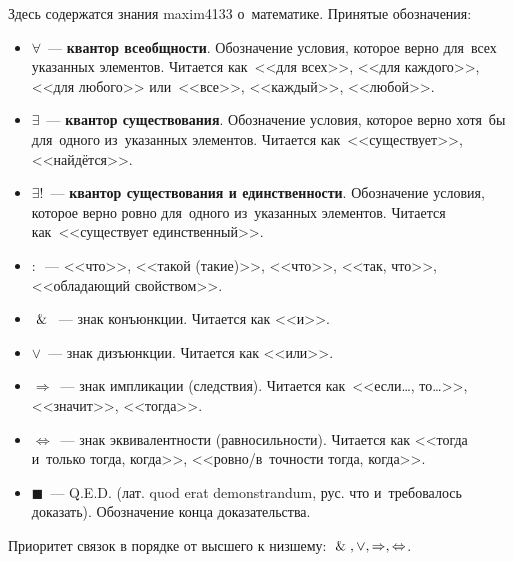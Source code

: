 Здесь содержатся знания maxim4133 о~математике. Принятые обозначения:
\begin{itemize}
	\item $\forall$~--- \textbf{квантор всеобщности}.
	Обозначение условия, которое верно для~всех указанных элементов.
	Читается как~<<для всех>>, <<для каждого>>, <<для любого>> или~<<все>>, <<каждый>>, <<любой>>.
	
	\item $\exists$~--- \textbf{квантор существования}.
	Обозначение условия, которое верно хотя~бы для~одного из~указанных элементов.
	Читается как~<<существует>>, <<найдётся>>.
	
	\item $\exists!$~--- \textbf{квантор существования и единственности}.
	Обозначение условия, которое верно ровно для~одного из~указанных элементов.
	Читается как~<<существует единственный>>.
	
	\item $\colon$~--- <<что>>, <<такой (такие)>>, <<что>>, <<так, что>>, <<обладающий свойством>>.
	
	\item $\And$~--- знак конъюнкции. Читается как <<и>>.
	
	\item $\lor$~--- знак дизъюнкции. Читается как <<или>>.
	
	\item $\Rightarrow$~--- знак импликации (следствия).
	Читается как~<<если\dots, то\dots>>, <<значит>>, <<тогда>>.
	
	\item $\Leftrightarrow$~--- знак эквивалентности (равносильности).
	Читается как <<тогда и~только тогда, когда>>, <<ровно/в~точности тогда, когда>>.
	
	\item $\scriptstyle \blacksquare$~--- Q.E.D. (лат. quod erat demonstrandum, рус. что и~требовалось доказать).
	Обозначение конца доказательства.
\end{itemize}

Приоритет связок в порядке от высшего к низшему: $\And, \lor, \Rightarrow, \Leftrightarrow$.